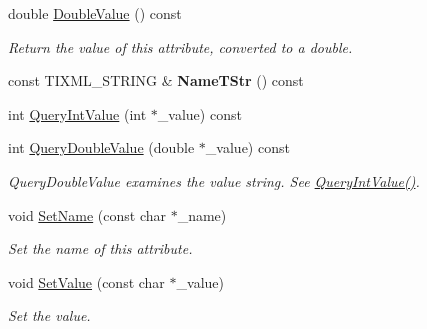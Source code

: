 \begin{DoxyCompactItemize}
\mbox{\label{classTiXmlAttribute_a8cca240fb2a7130c87b0fc6156e8b34f}} 
double \hyperlink{classTiXmlAttribute_a8cca240fb2a7130c87b0fc6156e8b34f}{Double\+Value} () const
\begin{DoxyCompactList}\small\item\em Return the value of this attribute, converted to a double. \end{DoxyCompactList}\item 
\mbox{\label{classTiXmlAttribute_a2bd49ec37463a0a2d081e6587f8b89b8}} 
const T\+I\+X\+M\+L\+\_\+\+S\+T\+R\+I\+NG \& {\bfseries Name\+T\+Str} () const
\item 
int \hyperlink{classTiXmlAttribute_a6caa8090d2fbb7966700a16e45ed33de}{Query\+Int\+Value} (int $\ast$\+\_\+value) const
\item 
\mbox{\label{classTiXmlAttribute_a6fa41b710c1b79de37a97004aa600c06}} 
int \hyperlink{classTiXmlAttribute_a6fa41b710c1b79de37a97004aa600c06}{Query\+Double\+Value} (double $\ast$\+\_\+value) const
\begin{DoxyCompactList}\small\item\em Query\+Double\+Value examines the value string. See \hyperlink{classTiXmlAttribute_a6caa8090d2fbb7966700a16e45ed33de}{Query\+Int\+Value()}. \end{DoxyCompactList}\item 
\mbox{\label{classTiXmlAttribute_ab7fa3d21ff8d7c5764cf9af15b667a99}} 
void \hyperlink{classTiXmlAttribute_ab7fa3d21ff8d7c5764cf9af15b667a99}{Set\+Name} (const char $\ast$\+\_\+name)
\begin{DoxyCompactList}\small\item\em Set the name of this attribute. \end{DoxyCompactList}\item 
\mbox{\label{classTiXmlAttribute_a2dae44178f668b3cb48101be4f2236a0}} 
void \hyperlink{classTiXmlAttribute_a2dae44178f668b3cb48101be4f2236a0}{Set\+Value} (const char $\ast$\+\_\+value)
\begin{DoxyCompactList}\small\item\em Set the value. \end{DoxyCompactList}\item 
\mbox{\label{classTiXmlAttribute_a7e065df640116a62ea4f4b7da5449cc8}} 

\end{DoxyCompactItemize}

